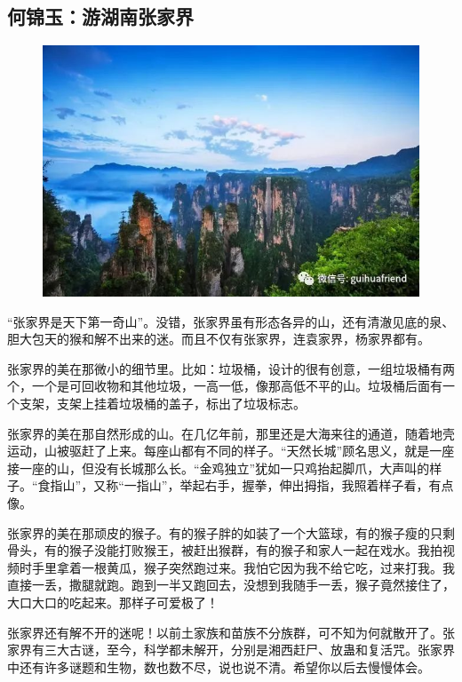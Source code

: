 \vspace{10pt}

{\centering\subsection*{何锦玉：游湖南张家界}}


\renewcommand{\leftmark}{何锦玉：游湖南张家界}

\begin{figure}[htbp]

\centering

\includegraphics[width = .5\textwidth]{./ch/17.jpg}

\end{figure}



“张家界是天下第一奇山”。没错，张家界虽有形态各异的山，还有清澈见底的泉、胆大包天的猴和解不出来的迷。而且不仅有张家界，连袁家界，杨家界都有。

张家界的美在那微小的细节里。比如：垃圾桶，设计的很有创意，一组垃圾桶有两个，一个是可回收物和其他垃圾，一高一低，像那高低不平的山。垃圾桶后面有一个支架，支架上挂着垃圾桶的盖子，标出了垃圾标志。

张家界的美在那自然形成的山。在几亿年前，那里还是大海来往的通道，随着地壳运动，山被驱赶了上来。每座山都有不同的样子。“天然长城”顾名思义，就是一座接一座的山，但没有长城那么长。“金鸡独立”犹如一只鸡抬起脚爪，大声叫的样子。“食指山”，又称“一指山”，举起右手，握拳，伸出拇指，我照着样子看，有点像。

张家界的美在那顽皮的猴子。有的猴子胖的如装了一个大篮球，有的猴子瘦的只剩骨头，有的猴子没能打败猴王，被赶出猴群，有的猴子和家人一起在戏水。我拍视频时手里拿着一根黄瓜，猴子突然跑过来。我怕它因为我不给它吃，过来打我。我直接一丢，撒腿就跑。跑到一半又跑回去，没想到我随手一丢，猴子竟然接住了，大口大口的吃起来。那样子可爱极了！

张家界还有解不开的迷呢！以前土家族和苗族不分族群，可不知为何就散开了。张家界有三大古谜，至今，科学都未解开，分别是湘西赶尸、放蛊和复活咒。张家界中还有许多谜题和生物，数也数不尽，说也说不清。希望你以后去慢慢体会。








